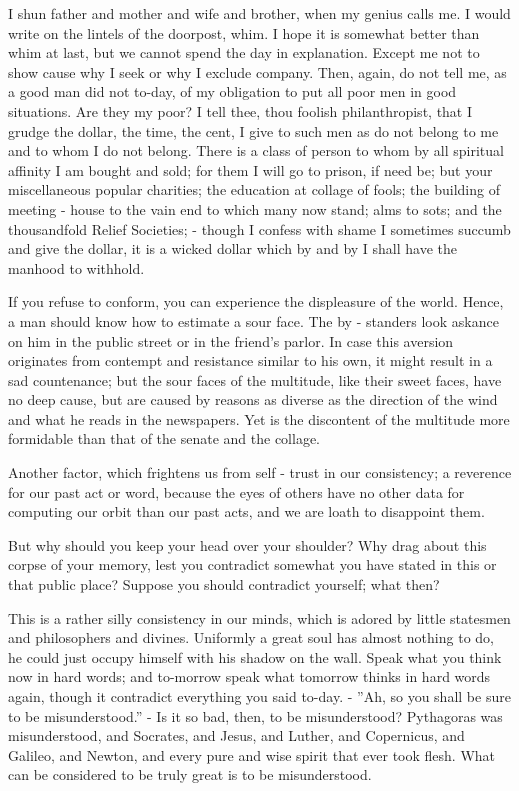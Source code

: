 I shun father and mother and wife and brother, when my genius calls me. I would write on the lintels of the doorpost, whim. I hope it is somewhat better than whim at last, but we cannot spend the day in explanation. Except me not to show cause why I seek or why I exclude company. Then, again, do not tell me, as a good man did not to-day, of my obligation to put all poor men in good situations. Are they my poor? I tell thee, thou foolish philanthropist, that I grudge the dollar, the time, the cent, I give to such men as do not belong to me and to whom I do not belong. There is a class of person to whom by all spiritual affinity I am bought and sold; for them I will go to prison, if need be; but your miscellaneous popular charities; the education at collage of fools; the building of meeting - house to the vain end to which many now stand; alms to sots; and the thousandfold Relief Societies; - though I confess with shame I sometimes succumb and give the dollar, it is a wicked dollar which by and by I shall have the manhood to withhold.

If you refuse to conform, you can experience the displeasure of the world. Hence, a man should know how to estimate a sour face. The by - standers look askance on him in the public street or in the friend's parlor. In case this aversion originates from contempt and resistance similar to his own, it might result in a sad countenance; but the sour faces of the multitude, like their sweet faces, have no deep cause, but are caused by reasons as diverse as the direction of the wind and what he reads in the newspapers. Yet is the discontent of the multitude more formidable than that of the senate and the collage.

Another factor, which frightens us from self - trust in our consistency; a reverence for our past act or word, because the eyes of others have no other data for computing our orbit than our past acts, and we are loath to disappoint them.

But why should you keep your head over your shoulder? Why drag about this corpse of your memory, lest you contradict somewhat you have stated in this or that public place? Suppose you should contradict yourself; what then?

This is a rather silly consistency in our minds, which is adored by little statesmen and philosophers and divines. Uniformly a great soul has almost nothing to do, he could just occupy himself with his shadow on the wall. Speak what you think now in hard words; and to-morrow speak what tomorrow thinks in hard words again, though it contradict everything you said to-day. - ''Ah, so you shall be sure to be misunderstood.'' - Is it so bad, then, to be misunderstood? Pythagoras was misunderstood, and Socrates, and Jesus, and Luther, and Copernicus, and Galileo, and Newton, and every pure and wise spirit that ever took flesh. What can be considered to be truly great is to be misunderstood.

